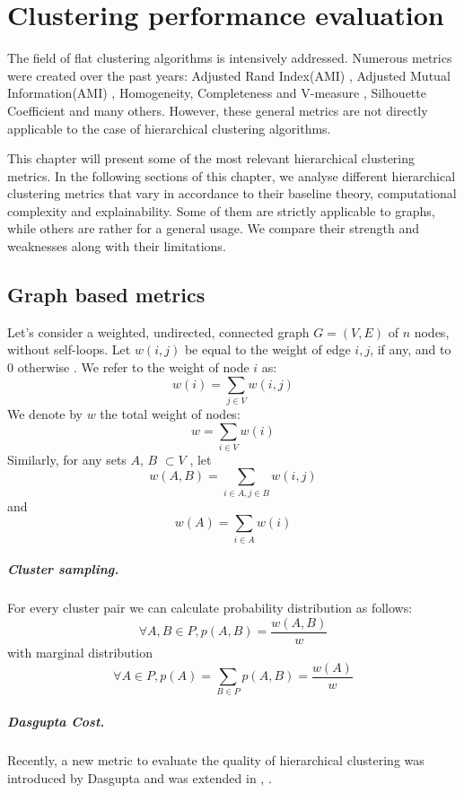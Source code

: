 \chapter{Clustering performance evaluation}
\label{related}

The field of flat clustering algorithms is intensively addressed. Numerous metrics were created over the past years: Adjusted Rand Index(AMI) \cite{hubert1985comparing}, Adjusted Mutual Information(AMI) \cite{vinh2010information}, Homogeneity, Completeness and V-measure \cite{rosenberg-hirschberg-2007-v}, Silhouette Coefficient \cite{ROUSSEEUW198753} and many others. However, these general metrics are not directly applicable to the case of hierarchical clustering algorithms. 

This chapter will present some of the most relevant hierarchical clustering metrics. 
In the following sections of this chapter, we analyse different hierarchical clustering metrics that vary in accordance to their baseline theory, computational complexity and explainability. Some of them are strictly applicable to graphs, while others are rather for a general usage.  We compare their strength and weaknesses along with their limitations. 

\section{Graph based metrics}
Let's consider a weighted, undirected, connected graph $G = (V, E)$ of $n$ nodes, without self-loops. Let $w(i, j)$ be equal to the weight of edge $i, j$, if any, and to 0 otherwise \cite{Bonald2018a}. 
We refer to the weight of node $i$ as: $$w(i) = \sum_{j \in V}w(i,j)$$
We denote by $w$ the total weight of nodes: $$w = \sum_{i \in V}w(i)$$
Similarly, for any sets $A$, $B$ $\subset V$ , let $$w(A,B) = \sum_{i \in A, j \in B}w(i,j)$$ and $$w(A) = \sum_{i \in A}w(i)$$

\paragraph{Cluster sampling.} For every cluster pair we can calculate probability distribution as follows:
$$\forall A, B \in P, p(A,B)=\frac{{w}(A,B)}{{w}}$$ with marginal distribution 
$$\forall A \in P, p(A)=\sum_{B \in P} p(A,B)=\frac{{w}(A)}{{w}}$$

\paragraph{Dasgupta Cost.}
Recently, a new metric to evaluate the quality of hierarchical clustering was introduced by Dasgupta \cite{dasgupta2016cost} and was extended in \cite{Cohen-Addad2017}, \cite{Cohen-Addad2019}. 

